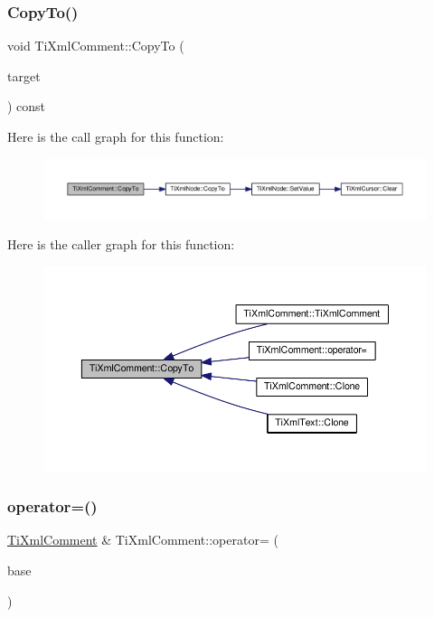 \subsubsection{\texorpdfstring{Copy\+To()}{CopyTo()}}
{\footnotesize\ttfamily void Ti\+Xml\+Comment\+::\+Copy\+To (\begin{DoxyParamCaption}\item[{\hyperlink{class_ti_xml_comment}{Ti\+Xml\+Comment} $\ast$}]{target }\end{DoxyParamCaption}) const\hspace{0.3cm}{\ttfamily [protected]}}

Here is the call graph for this function\+:\nopagebreak
\begin{figure}[H]
\begin{center}
\leavevmode
\includegraphics[width=350pt]{class_ti_xml_comment_aaeb8a0b2d503f603879a2d04ceb54295_cgraph}
\end{center}
\end{figure}
Here is the caller graph for this function\+:\nopagebreak
\begin{figure}[H]
\begin{center}
\leavevmode
\includegraphics[width=350pt]{class_ti_xml_comment_aaeb8a0b2d503f603879a2d04ceb54295_icgraph}
\end{center}
\end{figure}
\mbox{\label{class_ti_xml_comment_aeceedc15f8b8f9ca0b6136696339b3ac}} 
\subsubsection{\texorpdfstring{operator=()}{operator=()}}
{\footnotesize\ttfamily \hyperlink{class_ti_xml_comment}{Ti\+Xml\+Comment} \& Ti\+Xml\+Comment\+::operator= (\begin{DoxyParamCaption}\item[{const \hyperlink{class_ti_xml_comment}{Ti\+Xml\+Comment} \&}]{base }\end{DoxyParamCaption})}

